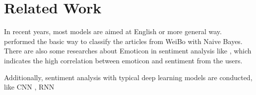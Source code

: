 \chapter{Related Work}

In recent years, most models are aimed at English or more general way. \cite{zhao2012moodlens} performed the basic way to classify the articles from WeiBo with Naive Bayes.  \\

There are also some researches about Emoticon in sentiment analysis like \cite{Emojis}, which indicates the high correlation between emoticon and sentiment from the users. 

Additionally, sentiment analysis with typical deep learning models are conducted, like CNN \cite{kim2014convolutional}, RNN \cite{arevian2007recurrent} 